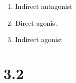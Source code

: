 \begin{enumerate}[label=\textbf{Q3.1.\arabic*}]
\begin{enumerate}[label=(\arabic*)]
        \item Indirect antagonist \quad \dotfill \quad \underline{\hspace{3cm}} 
        \item Direct agonist \quad \dotfill \quad \underline{\hspace{3cm}} 
        \item Indirect agonist \quad \dotfill \quad \underline{\hspace{3cm}} 
    \end{enumerate}


\end{enumerate}

\squigglyline
\section*{3.2}

